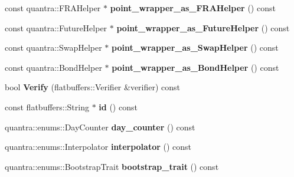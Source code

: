 \begin{DoxyCompactItemize}
const quantra\+::\+F\+R\+A\+Helper $\ast$ {\bfseries point\+\_\+wrapper\+\_\+as\+\_\+\+F\+R\+A\+Helper} () const
\item 
\mbox{\label{structquantra_1_1FLATBUFFERS__FINAL__CLASS_a35cc0261551151481fa754391c49b0d1}} 
const quantra\+::\+Future\+Helper $\ast$ {\bfseries point\+\_\+wrapper\+\_\+as\+\_\+\+Future\+Helper} () const
\item 
\mbox{\label{structquantra_1_1FLATBUFFERS__FINAL__CLASS_a66eb9935141a52050f56736c7a000cc2}} 
const quantra\+::\+Swap\+Helper $\ast$ {\bfseries point\+\_\+wrapper\+\_\+as\+\_\+\+Swap\+Helper} () const
\item 
\mbox{\label{structquantra_1_1FLATBUFFERS__FINAL__CLASS_ae48a884c17ce2dadeeb6bdd5fd03e7dc}} 
const quantra\+::\+Bond\+Helper $\ast$ {\bfseries point\+\_\+wrapper\+\_\+as\+\_\+\+Bond\+Helper} () const
\item 
\mbox{\label{structquantra_1_1FLATBUFFERS__FINAL__CLASS_aed693ee5a45b5f53af7411f9cab6793a}} 
bool {\bfseries Verify} (flatbuffers\+::\+Verifier \&verifier) const
\item 
\mbox{\label{structquantra_1_1FLATBUFFERS__FINAL__CLASS_ae066b12c3333e4cd04b4ada7fd4ffda6}} 
const flatbuffers\+::\+String $\ast$ {\bfseries id} () const
\item 
\mbox{\label{structquantra_1_1FLATBUFFERS__FINAL__CLASS_a955b9a33f908db3b82dea98242bc214e}} 
quantra\+::enums\+::\+Day\+Counter {\bfseries day\+\_\+counter} () const
\item 
\mbox{\label{structquantra_1_1FLATBUFFERS__FINAL__CLASS_a5a65a145ba6d887aaadc65f04f0f3672}} 
quantra\+::enums\+::\+Interpolator {\bfseries interpolator} () const
\item 
\mbox{\label{structquantra_1_1FLATBUFFERS__FINAL__CLASS_aa9bee89d88150e45bf9b731ed4d7b2c2}} 
quantra\+::enums\+::\+Bootstrap\+Trait {\bfseries bootstrap\+\_\+trait} () const

\end{DoxyCompactItemize}
